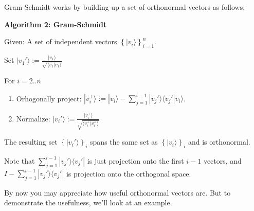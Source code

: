 \documentclass{amsbook}
\begin{document}
Gram-Schmidt works by building up a set of orthonormal vectors as follows:

\begin{tcolorbox}[title=Algorithm 2: Gram-Schmidt,colback=blue!5]
  {\bfseries\Large Algorithm 2: Gram-Schmidt}\label{Algorithm1}
  
Given: A set of independent vectors $\left\{|v_i\rangle\right\}_{i=1}^n$.

Set $|v_1'\rangle:=\frac{|v_1\rangle}{\sqrt{\langle v_1|v_1\rangle}}$

For $i=2..n$

\begin{enumerate}
  \item Orhogonally project:  $|v_i^\bot\rangle:=|v_i\rangle-\sum_{j=1}^{i-1}|v_j'\rangle\langle v_j'|v_i\rangle$.
  \item Normalize:  $|v_i'\rangle:=\frac{|v_i^\bot\rangle}{\sqrt{\langle v_i^\bot|v_i^\bot\rangle}}$
\end{enumerate}

The resulting set $\left\{|v_i'\rangle\right\}_i$ spans the same set as $\left\{|v_i\rangle\right\}_i$ and is orthonormal.
\end{tcolorbox}

Note that $\sum_{j=1}^{i-1}|v_j'\rangle\langle v_j'|$ is just projection onto the first $i-1$ vectors, and $I-\sum_{j=1}^{i-1}|v_j'\rangle\langle v_j'|$ is projection onto the orthogonal space.

By now you may appreciate how useful orthonormal vectors are.  But to demonstrate the usefulness, we'll look at an example.
\end{document}
